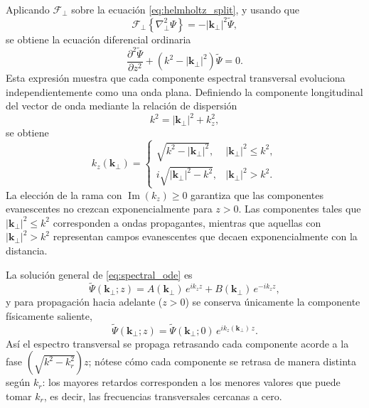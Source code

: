Aplicando $\mathscr F_\perp$ sobre la ecuación \eqref{eq:helmholtz_split}, y usando que
\begin{equation}
\mathscr F_\perp
\left\{
\nabla_\perp^2\Psi
\right\}
=
-|\mathbf k_\perp|^2
\tilde{\Psi},
\label{eq:fourier_laplacian}
\end{equation}
se obtiene la ecuación diferencial ordinaria
\begin{equation}
\frac{\partial^2\tilde{\Psi}}{\partial z^2}
+
\left(
k^2
-
|\mathbf k_\perp|^2
\right)
\tilde{\Psi}
=
0.
\label{eq:spectral_ode}
\end{equation}
Esta expresión muestra que cada componente espectral transversal evoluciona independientemente como una onda plana. Definiendo la componente longitudinal del vector de onda mediante la relación de dispersión
\begin{equation}
k^2
=
|\mathbf k_\perp|^2
+
k_z^2,
\label{eq:dispersion_relation}
\end{equation}
se obtiene
\begin{equation}
k_z(\mathbf k_\perp)
=
\begin{cases}
\sqrt{
k^2-|\mathbf k_\perp|^2
},
&
|\mathbf k_\perp|^2\leq k^2,
\\[6pt]
i\sqrt{
|\mathbf k_\perp|^2-k^2
},
&
|\mathbf k_\perp|^2>k^2.
\end{cases}
\label{eq:kz_definition}
\end{equation}
La elección de la rama con $\operatorname{Im}(k_z)\geq0$ garantiza que las componentes evanescentes no crezcan exponencialmente para $z>0$. Las componentes tales que
$|\mathbf k_\perp|^2\leq k^2$
corresponden a ondas propagantes, mientras que aquellas con
$|\mathbf k_\perp|^2>k^2$
representan campos evanescentes que decaen exponencialmente con la distancia.

La solución general de \eqref{eq:spectral_ode} es
\begin{equation}
\tilde{\Psi}(\mathbf k_\perp;z)
=
A(\mathbf k_\perp)\,
e^{ik_z z}
+
B(\mathbf k_\perp)\,
e^{-ik_z z},
\label{eq:general_solution_spectral}
\end{equation}
y para propagación hacia adelante ($z>0$) se conserva únicamente la componente físicamente saliente,
\begin{equation}
\tilde{\Psi}(\mathbf k_\perp;z)
=
\tilde{\Psi}(\mathbf k_\perp;0)\,
e^{ik_z(\mathbf k_\perp)\,z}.
\label{eq:spectral_propagation}
\end{equation}
Así el espectro transversal se propaga retrasando cada componente acorde a la fase $\left( \sqrt{k^2 - k_r^2} \right ) z$; nótese cómo cada componente se retrasa de manera distinta según $k_r$: los mayores retardos corresponden a los menores valores que puede tomar $k_r$, es decir, las frecuencias transversales cercanas a cero.

